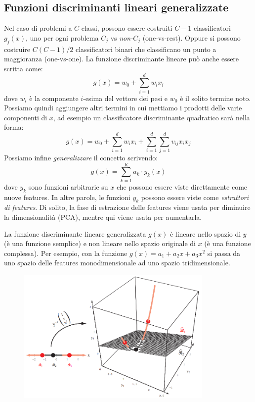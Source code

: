 \documentclass[a4paper,oneside,titlepage]{book}
\begin{document}
\subsection{Funzioni discriminanti lineari generalizzate}
Nel caso di problemi a $C$ classi, possono essere costruiti $C-1$ classificatori $g_j(x)$, uno per ogni problema $C_j$ vs \textit{non-}$C_j$ (one-vs-rest). Oppure si possono costruire $C(C-1)/2$ classificatori binari che classificano un punto a maggioranza (one-vs-one). La funzione discriminante lineare può anche essere scritta come:
\[ g(x) = w_0 + \sum_{i=1}^d w_i x_i \]
dove $w_i$ è la componente $i$-esima del vettore dei pesi e $w_0$ è il solito termine noto. Possiamo quindi aggiungere altri termini in cui mettiamo i prodotti delle varie componenti di $x$, ad esempio un classificatore discriminante quadratico sarà nella forma:
\[ g(x) = w_0 + \sum_{i=1}^d w_i x_i + \sum_{i=1}^d \sum_{j=1}^d v_{ij} x_i x_j \]
Possiamo infine \textit{generalizzare} il concetto scrivendo:
\[ g(x) = \sum_{k=1}^K a_k \cdot y_k(x) \]
dove $y_k$ sono funzioni arbitrarie su $x$ che possono essere viste direttamente come nuove features. In altre parole, le funzioni $y_k$ possono essere viste come \textit{estrattori di features}. Di solito, la fase di estrazione delle features viene usata per diminuire la dimensionalità (PCA), mentre qui viene usata per aumentarla.

La funzione discriminante lineare generalizzata $g(x)$ è lineare nello spazio di $y$ (è una funzione semplice) e non lineare nello spazio originale di $x$ (è una funzione complessa). Per esempio, con la funzione $g(x) = a_1 + a_2 x + a_3 x^2$ si passa da uno spazio delle features monodimensionale ad uno spazio tridimensionale.
\begin{figure}[htp]
	\centering
	\includegraphics[width=0.85\textwidth]{svm3.png}
\end{figure}
\end{document}
